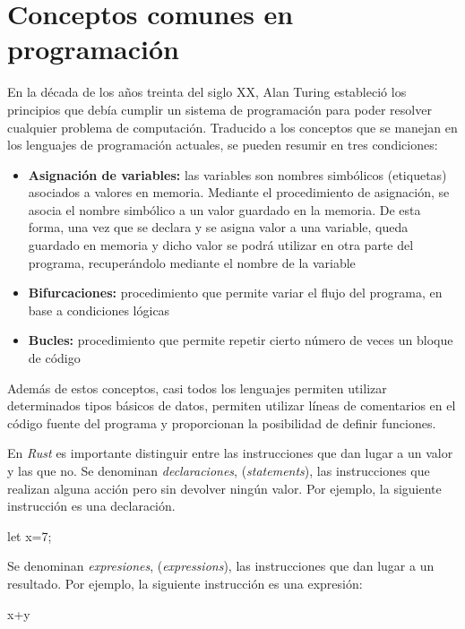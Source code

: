 \section{Conceptos comunes en programación}
\noindent En la década de los años treinta del siglo XX, Alan Turing estableció los principios que debía cumplir un sistema de programación para poder resolver cualquier problema de computación. Traducido a los conceptos que se manejan en los lenguajes de programación actuales, se pueden resumir en tres condiciones:
\begin{itemize}
   \item \textbf{Asignación de variables:} las variables son nombres simbólicos (etiquetas) asociados a valores en memoria. Mediante el procedimiento de asignación, se asocia el nombre simbólico a un valor guardado en la memoria. De esta forma, una vez que se declara y se asigna valor a una variable, queda
   guardado en memoria y dicho valor se podrá utilizar en otra parte del programa, recuperándolo mediante el nombre de la variable
   
   \item \textbf{Bifurcaciones:} procedimiento que permite variar el flujo del programa, en base a condiciones lógicas
   
   \item \textbf{Bucles:} procedimiento que permite repetir cierto número de veces un bloque de código
\end{itemize}

Además de estos conceptos, casi todos los lenguajes permiten utilizar determinados tipos básicos de datos, permiten utilizar líneas de comentarios en el código fuente del programa y proporcionan la posibilidad de definir funciones.

En \textit{Rust} es importante distinguir entre las instrucciones que dan lugar a un valor y las que no. Se denominan \textit{declaraciones}, (\textit{statements}), las instrucciones que realizan alguna acción pero sin devolver ningún valor. Por ejemplo, la siguiente instrucción es una declaración.

\begin{Codigo}
   let x=7;
\end{Codigo}

Se denominan \textit{expresiones}, (\textit{expressions}), las instrucciones que dan lugar a un resultado. Por ejemplo, la siguiente instrucción es una expresión:

\begin{Codigo}
   x+y
\end{Codigo}


